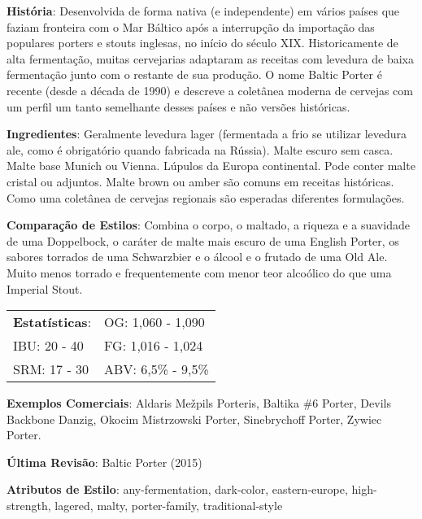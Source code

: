 \textbf{História}: Desenvolvida de forma nativa (e independente) em vários países que faziam fronteira com o Mar Báltico após a interrupção da importação das populares porters e stouts inglesas, no início do século XIX. Historicamente de alta fermentação, muitas cervejarias adaptaram as receitas com levedura de baixa fermentação junto com o restante de sua produção. O nome Baltic Porter é recente (desde a década de 1990) e descreve a coletânea moderna de cervejas com um perfil um tanto semelhante desses países e não versões históricas.

\textbf{Ingredientes}: Geralmente levedura lager (fermentada a frio se utilizar levedura ale, como é obrigatório quando fabricada na Rússia). Malte escuro sem casca. Malte base Munich ou Vienna. Lúpulos da Europa continental. Pode conter malte cristal ou adjuntos. Malte brown ou amber são comuns em receitas históricas. Como uma coletânea de cervejas regionais são esperadas diferentes formulações.

\textbf{Comparação de Estilos}: Combina o corpo, o maltado, a riqueza e a suavidade de uma Doppelbock, o caráter de malte mais escuro de uma English Porter, os sabores torrados de uma Schwarzbier e o álcool e o frutado de uma Old Ale. Muito menos torrado e frequentemente com menor teor alcoólico do que uma Imperial Stout.

\begin{tabular}{@{}p{35mm}p{35mm}@{}}
  \textbf{Estatísticas}: & OG: 1,060 - 1,090 \\
  IBU: 20 - 40 & FG: 1,016 - 1,024 \\
  SRM: 17 - 30 & ABV: 6,5\% - 9,5\%
\end{tabular}

\textbf{Exemplos Comerciais}: Aldaris Mežpils Porteris, Baltika \#6 Porter, Devils Backbone Danzig, Okocim Mistrzowski Porter, Sinebrychoff Porter, Zywiec Porter.

\textbf{Última Revisão}: Baltic Porter (2015)

\textbf{Atributos de Estilo}: any-fermentation, dark-color, eastern-europe, high-strength, lagered, malty, porter-family, traditional-style
